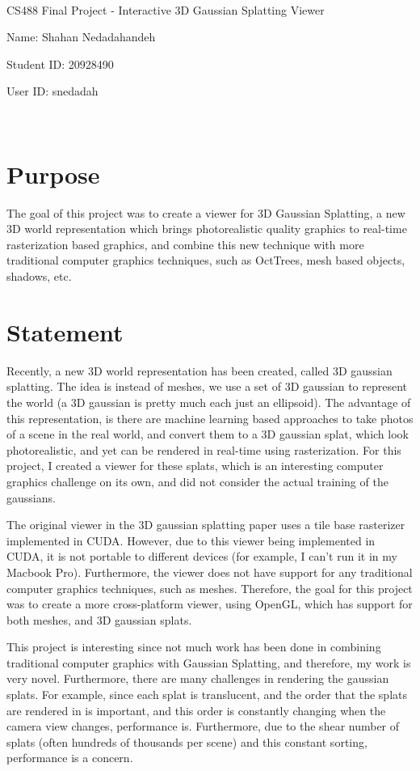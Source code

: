 \documentclass {article}
\begin{document}
~\vfill
\begin{center}
\Large

CS488 Final Project - Interactive 3D Gaussian Splatting Viewer

Name: Shahan Nedadahandeh

Student ID: 20928490

User ID: snedadah

\end{center}
\vfill ~\vfill~
\newpage

\section{Purpose}
     The goal of this project was to create a viewer for 3D Gaussian Splatting, a new 3D world representation which brings photorealistic quality graphics to real-time rasterization based graphics, and combine this new technique with more traditional computer graphics techniques, such as OctTrees, mesh based objects, shadows, etc.

\section{Statement}
     Recently, a new 3D world representation has been created, called 3D gaussian splatting. The idea is instead of meshes, we use a set of 3D gaussian to represent the world (a 3D gaussian is pretty much each just an ellipsoid). The advantage of this representation, is there are machine learning based approaches to take photos of a scene in the real world, and convert them to a 3D gaussian splat, which look photorealistic, and yet can be rendered in real-time using rasterization. For this project, I created a viewer for these splats, which is an interesting computer graphics challenge on its own, and did not consider the actual training of the gaussians.

     The original viewer in the 3D gaussian splatting paper uses a tile base rasterizer implemented in CUDA. However, due to this viewer being implemented in CUDA, it is not portable to different devices (for example, I can't run it in my Macbook Pro). Furthermore, the viewer does not have support for any traditional computer graphics techniques, such as meshes. Therefore, the goal for this project was to create a more cross-platform viewer, using OpenGL, which has support for both meshes, and 3D gaussian splats.
     
     This project is interesting since not much work has been done in combining traditional computer graphics with Gaussian Splatting, and therefore, my work is very novel. Furthermore, there are many challenges in rendering the gaussian splats. For example, since each splat is translucent, and the order that the splats are rendered in is important, and this order is constantly changing when the camera view changes, performance is. Furthermore, due to the shear number of splats (often hundreds of thousands per scene) and this constant sorting, performance is a concern.
\end{document}
